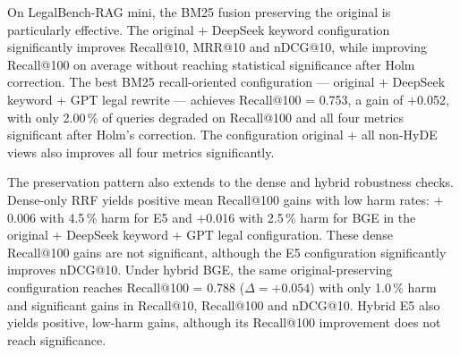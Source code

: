 \documentclass[a4paper,fleqn]{cas-dc}
\begin{document}
On LegalBench-RAG mini, the BM25 fusion preserving the original
is particularly effective. The original + DeepSeek keyword
configuration significantly improves Recall@10, MRR@10 and
nDCG@10, while improving Recall@100 on average without reaching
statistical significance after Holm correction. The best
BM25 recall-oriented configuration --- original + DeepSeek
keyword + GPT legal rewrite --- achieves Recall@100 = 0.753,
a gain of $+$0.052, with only 2.00\,\% of queries degraded
on Recall@100 and all four metrics significant after Holm’s
correction. The configuration original + all non-HyDE views
also improves all four metrics significantly.

The preservation pattern also extends to the dense and hybrid
robustness checks. Dense-only RRF yields positive mean Recall@100
gains with low harm rates: $+$0.006 with 4.5\,\% harm for E5
and $+$0.016 with 2.5\,\% harm for BGE in the
original + DeepSeek keyword + GPT legal configuration. These
dense Recall@100 gains are not significant, although the E5
configuration significantly improves nDCG@10. Under hybrid BGE,
the same original-preserving configuration reaches
Recall@100 = 0.788 ($\Delta=+0.054$) with only 1.0\,\% harm
and significant gains in Recall@10, Recall@100 and nDCG@10.
Hybrid E5 also yields positive, low-harm gains, although its
Recall@100 improvement does not reach significance.
\end{document}
